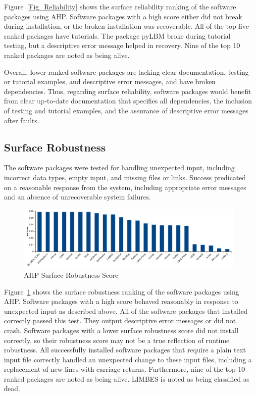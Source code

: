 \documentclass[final, 3p, times, authoryear]{elsarticle}
\begin{document}
Figure~\ref{Fig_Reliability} shows the surface reliability ranking of the
software packages using AHP. Software packages with a high score either did not
break during installation, or the broken installation was recoverable. All of
the top five ranked packages have tutorials. The package pyLBM broke
during tutorial testing, but a descriptive error message helped in recovery.
Nine of the top 10 ranked packages are noted as being alive. 

Overall, lower ranked software packages are lacking clear documentation, testing
or tutorial examples, and descriptive error messages, and have broken
dependencies. Thus, regarding surface reliability, software packages would
benefit from clear up-to-date documentation that specifies all dependencies, the
inclusion of testing and tutorial examples, and the assurance of descriptive
error messages after faults.

\subsection{Surface Robustness}

The software packages were tested for handling unexpected input, including
incorrect data types, empty input, and missing files or links. Success
predicated on a reasonable response from the system, including appropriate error
messages and an absence of unrecoverable system failures. 

\begin{figure}[h!]
	\begin{center}
		\includegraphics[width=1.0\textwidth]{./figures/robustness_chart.pdf}
		\caption{AHP Surface Robustness Score}
		\label{Fig_Robustness}
	\end{center}
\end{figure}

Figure~\ref{Fig_Robustness} shows the surface robustness ranking of the software
packages using AHP. Software packages with a high score behaved reasonably in
response to unexpected input as described above. All of the software packages
that installed correctly passed this test. They output descriptive error
messages or did not crash. Software packages with a lower surface robustness
score did not install correctly, so their robustness score may not be a true
reflection of runtime robustness. All successfully installed software packages
that require a plain text input file correctly handled an unexpected change to
these input files, including a replacement of new lines with carriage returns.
Furthermore, nine of the top 10 ranked packages are noted as being alive. LIMBES
is noted as being classified as dead.
\end{document}
